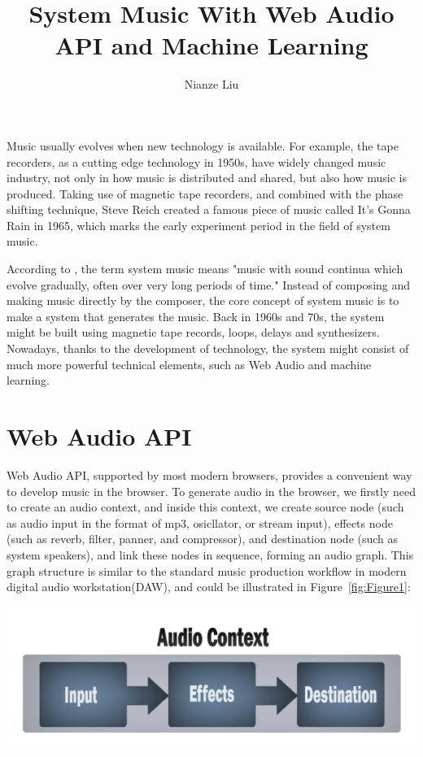 \documentclass[man]{apa6}
\title{System Music With Web Audio API and Machine Learning}
\author{Nianze Liu}
\affiliation{New York University}
\begin{document}
\maketitle

Music usually evolves when new technology is available. For example, the tape recorders, as a cutting edge technology in 1950s, have widely changed music industry, not only in how music is distributed and shared, but also how music is produced. Taking use of magnetic tape recorders, and combined with the phase shifting technique, Steve Reich created a famous piece of music called It's Gonna Rain in 1965, which marks the early experiment period in the field of system music. 

According to \textcite{sutherland1994new}, the term system music means "music with sound continua which evolve gradually, often over very long periods of time." Instead of composing and making music directly by the composer, the core concept of system music is to make a system that generates the music. Back in 1960s and 70s, the system might be built using magnetic tape records, loops, delays and synthesizers. Nowadays, thanks to the development of technology, the system might consist of much more powerful technical elements, such as Web Audio and machine learning.

\section{Web Audio API}

Web Audio API, supported by most modern browsers, provides a convenient way to develop music in the browser. To generate audio in the browser, we firstly need to create an audio context, and inside this context, we create source node (such as audio input in the format of mp3, osicllator, or stream input), effects node (such as reverb, filter, panner, and compressor), and destination node (such as system speakers), and link these nodes in sequence, forming an audio graph. This graph structure is similar to the standard music production workflow in modern digital audio workstation(DAW), and could be illustrated in Figure~\ref{fig:Figure1}:

\begin{center}
  \centering
  \includegraphics[width=\linewidth]{audio_context.png}
  \label{fig:Figure1}
\end{center}
\end{document}
